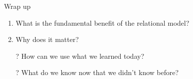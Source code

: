 \documentclass[aspectratio=169]{beamer}
\begin{document}

\begin{frame}{Wrap up}
\begin{enumerate}
\item What is the fundamental benefit of the relational model?
\item Why does it matter?
\end{enumerate}

\begin{itemize}
	\item[?] How can we use what we learned today?
	\vspace{2em}
	\item[?] What do we know now that we didn't know before?
\end{itemize}


\end{frame}
\end{document}
